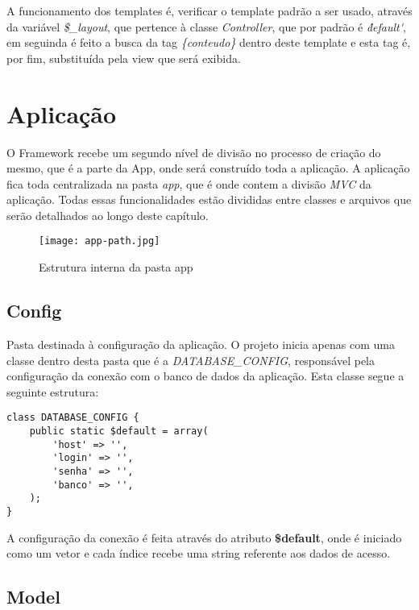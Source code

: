             A funcionamento dos templates é, verificar o template padrão a ser usado, através da variável \emph{\$\_layout}, que pertence à classe \emph{Controller}, que por padrão é \emph{\'default\'}, em seguinda é feito a busca da tag \emph{\{conteudo\}} dentro deste template e esta tag é, por fim, substituída pela view que será exibida.


    \section{Aplicação\label{sec:app}}

        O Framework recebe um segundo nível de divisão no processo de criação do mesmo, que é a parte da App, onde será construído toda a aplicação. A aplicação fica toda centralizada na pasta \emph{app}, que é onde contem a divisão \emph{MVC} da aplicação. Todas essas funcionalidades estão divididas entre classes e arquivos que serão detalhados ao longo deste capítulo.

    \begin{figure}[!htb]
        \centering
        \texttt{[image: app-path.jpg]}
        \caption{\small Estrutura interna da pasta app}
        \label{cap:sass}
    \end{figure}

        \subsection{Config\label{sec:app-config}}
            Pasta destinada à configuração da aplicação. O projeto inicia apenas com uma classe dentro desta pasta que é a \emph{DATABASE\_CONFIG}, responsável pela configuração da conexão com o banco de dados da aplicação. Esta classe segue a seguinte estrutura:


\begin{lstlisting}
class DATABASE_CONFIG {
    public static $default = array(
        'host' => '',
        'login' => '',
        'senha' => '',
        'banco' => '',
    );
}
\end{lstlisting}


            A configuração da conexão é feita através do atributo \textbf{\$default}, onde é iniciado como um vetor e cada índice recebe uma string referente aos dados de acesso.

        \subsection{Model\label{sec:app-model}}


